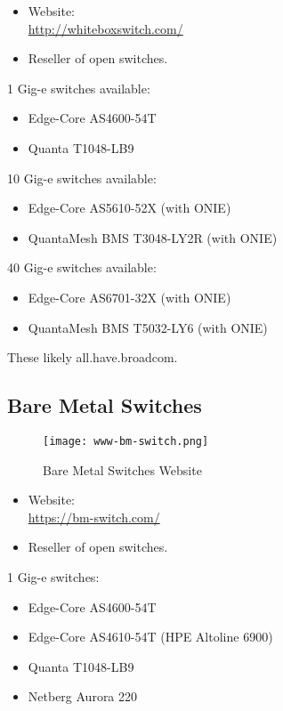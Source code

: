 \begin{itemize}
 \item Website: \\ \url{http://whiteboxswitch.com/}
 \item Reseller of open switches.
\end{itemize}


1 Gig-e switches available:
\begin{itemize}
 \item Edge-Core AS4600-54T
 \item Quanta T1048-LB9
\end{itemize}


10 Gig-e switches available:
\begin{itemize}
 \item Edge-Core AS5610-52X (with ONIE)
 \item QuantaMesh BMS T3048-LY2R (with ONIE)
\end{itemize}


40 Gig-e switches available:
\begin{itemize}
 \item Edge-Core AS6701-32X (with ONIE)
 \item QuantaMesh BMS T5032-LY6 (with ONIE)
\end{itemize}


These likely all.have.broadcom.


\subsection{Bare Metal Switches}
\begin{figure}[h!]
\texttt{[image: www-bm-switch.png]}
 \caption{Bare Metal Switches Website}
 \label{fig:www-bm-switch}
\end{figure}


\begin{itemize}
 \item Website: \\ \url{https://bm-switch.com/}
 \item Reseller of open switches.
\end{itemize}


1 Gig-e switches:
\begin{itemize}
 \item Edge-Core AS4600-54T
 \item Edge-Core AS4610-54T (HPE Altoline 6900)
 \item Quanta T1048-LB9
 \item Netberg Aurora 220
\end{itemize}


